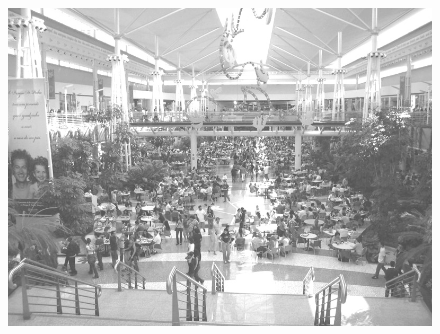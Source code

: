 \begin{figure}[h!]
    \centering
    \includegraphics[scale=0.28,keepaspectratio=true]{img/imgs/7-diversao/-057.jpg}
\end{figure}

